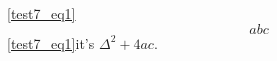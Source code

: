 \autoref{test7_eq1}
\begin{equation}\label{test7_eq1}
abc
\end{equation}
\autoref{test7_eq1}it's $\Delta^2+4ac$.